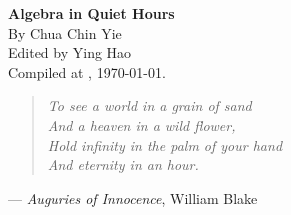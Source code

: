 \documentclass[english,10pt,a5paper]{article}
\theoremstyle{definition}
\begin{document}
	\begin{titlepage}
		\vspace*{4cm}
		\begin{center}
			\Large \textbf{Algebra in Quiet Hours} \smallskip
			\\
			\large	By Chua Chin Yie 
			\\[1em] \small Edited by Ying Hao 
			\\ \small Compiled at \currenttime, \today.
			\\[2em]
		\end{center}
		\vfill\vfill
		\begin{center}
			\small
			\begin{minipage}{0.7\textwidth}
				\begin{verse}
					\itshape
					To see a world in a grain of sand \\
					And a heaven in a wild flower, \\
					Hold infinity in the palm of your hand \\
					And eternity in an hour.
				\end{verse}
				
				\hspace{0.26\textwidth} %
				--- \textit{Auguries of Innocence}, William Blake
				
			\end{minipage}
		\end{center}
		\vfill
\end{titlepage}
	
\clearpage
    \tableofcontents 
    
    
\clearpage
{}
    
\begingroup
\allowdisplaybreaks
{





















}\endgroup

\clearpage
{}
\printbibliography
\end{document}
